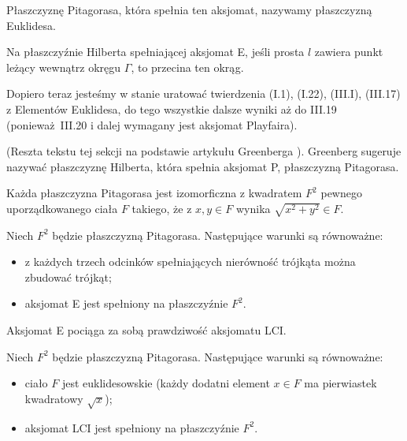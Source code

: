 Płaszczyznę Pitagorasa, która spełnia ten aksjomat, nazywamy płaszczyzną Euklidesa.

\begin{proposition}
    Na płaszczyźnie Hilberta spełniającej aksjomat E, jeśli prosta $l$ zawiera punkt leżący wewnątrz okręgu $\Gamma$, to przecina ten okrąg.
\end{proposition}

Dopiero teraz jesteśmy w stanie uratować twierdzenia (I.1), (I.22), (III.I), (III.17) z Elementów Euklidesa, do tego wszystkie dalsze wyniki aż do III.19 (ponieważ III.20 i dalej wymagany jest aksjomat Playfaira).


(Reszta tekstu tej sekcji na podstawie artykułu Greenberga \cite[s. 201]{greenberg_2010}).
Greenberg sugeruje nazywać płaszczyznę Hilberta, która spełnia aksjomat P, płaszczyzną Pitagorasa.
%
%

\begin{proposition}
    Każda płaszczyzna Pitagorasa jest izomorficzna z kwadratem $F^2$ pewnego uporządkowanego ciała $F$ takiego, że z $x, y \in F$ wynika $\sqrt{x^2 + y^2} \in F$.
\end{proposition}

\begin{proposition}
    Niech $F^2$ będzie płaszczyzną Pitagorasa.
    Następujące warunki są równoważne:
    \begin{itemize}
        \item z każdych trzech odcinków spełniających nierówność trójkąta można zbudować trójkąt; 
        \item aksjomat E jest spełniony na płaszczyźnie $F^2$.
    \end{itemize}
\end{proposition}

Aksjomat E pociąga za sobą prawdziwość aksjomatu LCI.

\begin{proposition}
    Niech $F^2$ będzie płaszczyzną Pitagorasa.
    Następujące warunki są równoważne:
    \begin{itemize}
        \item ciało $F$ jest euklidesowskie (każdy dodatni element $x \in F$ ma pierwiastek kwadratowy $\sqrt{x}$);
        \item aksjomat LCI jest spełniony na płaszczyźnie $F^2$.
    \end{itemize}
\end{proposition}

